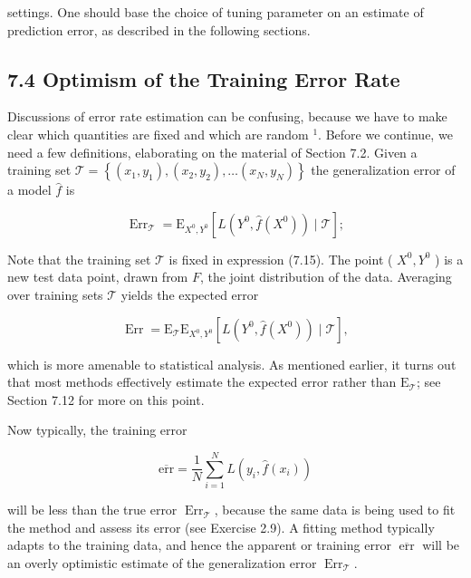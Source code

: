 \documentclass[10pt]{article}
\begin{document}
settings. One should base the choice of tuning parameter on an estimate of prediction error, as described in the following sections.

\subsection*{7.4 Optimism of the Training Error Rate}
Discussions of error rate estimation can be confusing, because we have to make clear which quantities are fixed and which are random ${ }^{1}$. Before we continue, we need a few definitions, elaborating on the material of Section 7.2. Given a training set $\mathcal{T}=\left\{\left(x_{1}, y_{1}\right),\left(x_{2}, y_{2}\right), \ldots\left(x_{N}, y_{N}\right)\right\}$ the generalization error of a model $\hat{f}$ is


\begin{equation*}
\operatorname{Err}_{\mathcal{T}}=\mathrm{E}_{X^{0}, Y^{0}}\left[L\left(Y^{0}, \hat{f}\left(X^{0}\right)\right) \mid \mathcal{T}\right] ; \tag{7.15}
\end{equation*}


Note that the training set $\mathcal{T}$ is fixed in expression (7.15). The point ( $X^{0}, Y^{0}$ ) is a new test data point, drawn from $F$, the joint distribution of the data. Averaging over training sets $\mathcal{T}$ yields the expected error


\begin{equation*}
\operatorname{Err}=\mathrm{E}_{\mathcal{T}} \mathrm{E}_{X^{0}, Y^{0}}\left[L\left(Y^{0}, \hat{f}\left(X^{0}\right)\right) \mid \mathcal{T}\right], \tag{7.16}
\end{equation*}


which is more amenable to statistical analysis. As mentioned earlier, it turns out that most methods effectively estimate the expected error rather than $\mathrm{E}_{\mathcal{T}}$; see Section 7.12 for more on this point.

Now typically, the training error


\begin{equation*}
\overline{\mathrm{err}}=\frac{1}{N} \sum_{i=1}^{N} L\left(y_{i}, \hat{f}\left(x_{i}\right)\right) \tag{7.17}
\end{equation*}


will be less than the true error $\operatorname{Err}_{\mathcal{T}}$, because the same data is being used to fit the method and assess its error (see Exercise 2.9). A fitting method typically adapts to the training data, and hence the apparent or training error $\overline{\operatorname{err}}$ will be an overly optimistic estimate of the generalization error $\operatorname{Err}_{\mathcal{T}}$.
\end{document}
